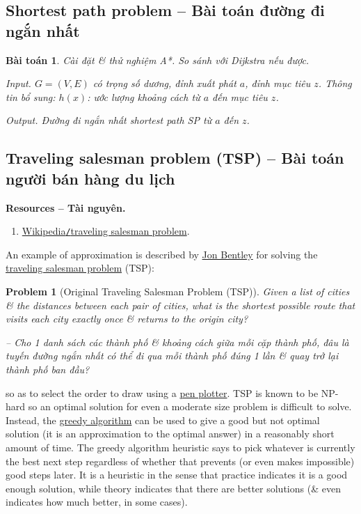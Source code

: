 \documentclass{article}
\newtheorem{baitoan}{Bài toán}
\newtheorem{problem}{Problem}
\begin{document}

\subsection{Shortest path problem -- Bài toán đường đi ngắn nhất}

\begin{baitoan}
	Cài đặt \& thử nghiệm A*. So sánh với Dijkstra nếu được.
	\item {\sf Input.} $G = (V,E)$ có trọng số dương, đỉnh xuất phát $a$, đỉnh mục tiêu $z$. Thông tin bổ sung: $h(x)$: ước lượng khoảng cách từ $a$ đến mục tiêu $z$.
	\item {\sf Output.} Đường đi ngắn nhất shortest path SP từ $a$ đến $z$.
\end{baitoan}


\subsection{Traveling salesman problem (TSP) -- Bài toán người bán hàng du lịch}
\textbf{\textbf{Resources -- Tài nguyên.}}
\begin{enumerate}
	\item \href{https://en.wikipedia.org/wiki/Travelling_salesman_problem}{Wikipedia{\tt/}traveling salesman problem}.
\end{enumerate}
An example of approximation is described by \href{https://en.wikipedia.org/wiki/Jon_Bentley_(computer_scientist)}{\sc Jon Bentley} for solving the \href{https://en.wikipedia.org/wiki/Travelling_salesman_problem}{traveling salesman problem} (TSP):

\begin{problem}[Original Traveling Salesman Problem (TSP)]
	Given a list of cities \& the distances between each pair of cities, what is the shortest possible route that visits each city exactly once \& returns to the origin city?
	
	-- Cho 1 danh sách các thành phố \& khoảng cách giữa mỗi cặp thành phố, đâu là tuyến đường ngắn nhất có thể đi qua mỗi thành phố đúng 1 lần \& quay trở lại thành phố ban đầu?
\end{problem}
so as to select the order to draw using a \href{https://en.wikipedia.org/wiki/Pen_plotter}{pen plotter}. TSP is known to be NP-hard so an optimal solution for even a moderate size problem is difficult to solve. Instead, the \href{https://en.wikipedia.org/wiki/Greedy_algorithm}{greedy algorithm} can be used to give a good but not optimal solution (it is an approximation to the optimal answer) in a reasonably short amount of time. The greedy algorithm heuristic says to pick whatever is currently the best next step regardless of whether that prevents (or even makes impossible) good steps later. It is a heuristic in the sense that practice indicates it is a good enough solution, while theory indicates that there are better solutions (\& even indicates how much better, in some cases).
\end{document}
